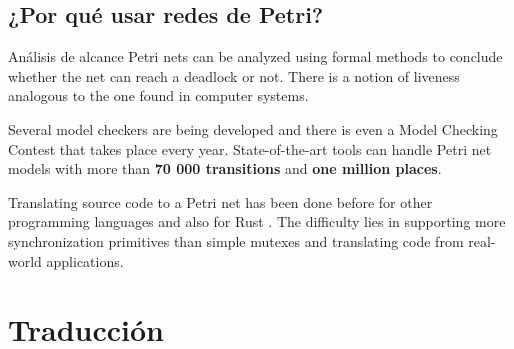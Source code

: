 \documentclass{beamer}
\begin{document}
\subsection{¿Por qué usar redes de Petri?}

\begin{frame}{Análisis de alcance}
  Petri nets can be analyzed using formal methods to conclude whether the net can reach
  a deadlock or not. There is a notion of liveness analogous to the one found in computer systems.

  \vfill
  \pause

  Several model checkers are being developed and
  there is even a Model Checking Contest that takes place every year.
  State-of-the-art tools can handle Petri net models
  with more than \textbf{70 000 transitions} and \textbf{one million places}.

  \vfill
  \pause

  Translating source code to a Petri net has been done before for other programming languages
  \cite{kavi2002modeling,moshtaghi2001} and also for Rust \cite{meyer2020, zhang2022deadlocks}.
  The difficulty lies in supporting more synchronization primitives
  than simple mutexes and translating code from real-world applications.
\end{frame}

\section{Traducción}
\end{document}
